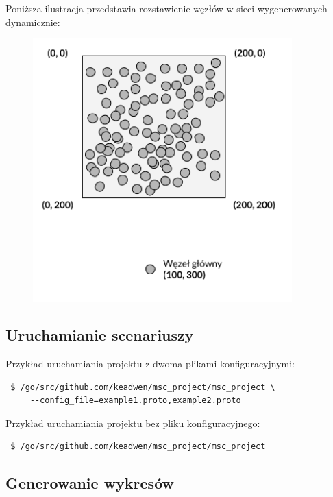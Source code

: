 \documentclass[a4paper,12pt,twoside,openany]{report}
\begin{document}
Poniższa ilustracja przedstawia rozstawienie węzłów w sieci wygenerowanych dynamicznie:

\begin{figure}[H]
 \centering
 \includegraphics[width=10cm]{images/przykladowa_sieci_wygenerowana.png} 
\end{figure}

\subsection{Uruchamianie scenariuszy}

Przykład uruchamiania projektu z dwoma plikami konfiguracyjnymi:
\begin{lstlisting}
 $ /go/src/github.com/keadwen/msc_project/msc_project \
     --config_file=example1.proto,example2.proto
\end{lstlisting}

Przykład uruchamiania projektu bez pliku konfiguracyjnego:
\begin{lstlisting}
 $ /go/src/github.com/keadwen/msc_project/msc_project
\end{lstlisting}

\subsection{Generowanie wykresów}
\end{document}
